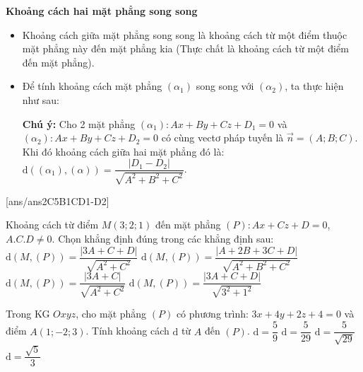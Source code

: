 \textbf{Khoảng cách hai mặt phẳng song song}
\begin{itemize}
\item Khoảng cách giữa mặt phẳng song song là khoảng cách từ một điểm thuộc mặt phẳng này đến mặt phẳng kia (Thực chất là khoảng cách từ một điểm đến mặt phẳng).
\item Để tính khoảng cách mặt phẳng $(\alpha_1)$ song song với $(\alpha_2)$, ta thực hiện như sau:
\textbf{Chú ý:} Cho 2 mặt phẳng $(\alpha_1)\colon Ax+By+Cz+D_1=0$ và $(\alpha_2)\colon Ax+By+Cz+D_2=0$ có cùng vectơ pháp tuyến là $\vec{n}=(A;B;C)$.\\
Khi đó khoảng cách giữa hai mặt phẳng đó là: $\mathrm{d}((\alpha_1),(\alpha))=\dfrac{|D_1-D_2|}{\sqrt{A^2+B^2+C^2}}$.
\end{itemize}
\TN
{}[ans/ans2C5B1CD1-D2]
\begin{ex}%
	Khoảng cách từ điểm $M\left(3;2;1\right)$ đến mặt phẳng $(P)\colon Ax+Cz+D=0$, $A.C.D\ne 0$. Chọn khẳng định đúng trong các khẳng định sau:
\choice
{\True $\mathrm{d}(M,(P))=\dfrac{\left| 3A+C+D\right|}{\sqrt{A^2+C^2}}$}
{$\mathrm{d}(M,(P))=\dfrac{\left| A+2B+3C+D\right|}{\sqrt{A^2+B^2+C^2}}$}
{$\mathrm{d}(M,(P))=\dfrac{\left| 3A+C\right|}{\sqrt{A^2+C^2}}$}
{$\mathrm{d}(M,(P))=\dfrac{\left| 3A+C+D\right|}{\sqrt{3^2+1^2}}$}
\end{ex}

\begin{ex}%
	Trong KG $Oxyz$, cho mặt phẳng $(P)$ có phương trình: $3x+4y+2z+4=0$ và điểm $A(1;-2;3)$. Tính khoảng cách $\mathrm{d}$ từ $A$ đến $(P)$.
\choice
{$\mathrm{d}=\dfrac{5}{9}$}
{$\mathrm{d}=\dfrac{5}{29}$}
{\True $\mathrm{d}=\dfrac{5}{\sqrt{29}}$}
{$\mathrm{d}=\dfrac{\sqrt{5}}{3}$}
\end{ex}

